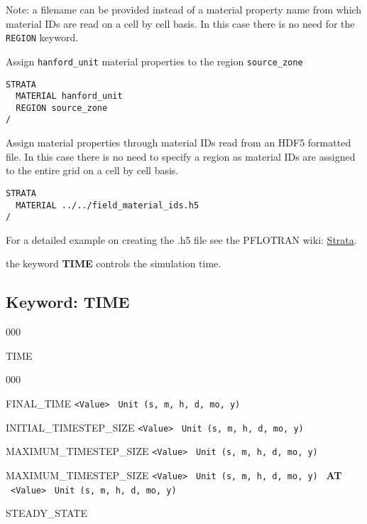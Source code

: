 \noindent
Note: a filename can be provided instead of a material property name from which material IDs are read on a cell by cell basis. In this case there is no need for the {\tt REGION} keyword.


\begin{mdframed}
\noindent
Assign {\tt hanford\_unit} material properties to the region {\tt source\_zone}

\begin{verbatim}
STRATA
  MATERIAL hanford_unit
  REGION source_zone
/
\end{verbatim}

\noindent
Assign material properties through material IDs read from an HDF5 formatted file. In this case there is no need to specify a region as material IDs are assigned to the entire grid on a cell by cell basis.

\begin{verbatim}
STRATA
  MATERIAL ../../field_material_ids.h5
/
\end{verbatim}

\noindent For a detailed example on creating the .h5 file see the PFLOTRAN wiki: \href{https://bitbucket.org/pflotran/pflotran-dev/wiki/Documentation/Strata}{Strata}.
\end{mdframed}

\hyperlink{target_key}{\return}


\newpage
\protect\hypertarget{target_time}{}

 the keyword {\bf TIME} controls the simulation time.

\subsection{Keyword: TIME}
\begin{deflist}{000}
\item[TIME] ~
\begin{deflist}{000}
\item[FINAL\_TIME] {\tt <Value>} \ {\tt Unit (s, m, h, d, mo, y)}
\item[INITIAL\_TIMESTEP\_SIZE] {\tt <Value>} \ {\tt Unit (s, m, h, d, mo, y)}
\item[MAXIMUM\_TIMESTEP\_SIZE] {\tt <Value>} \ {\tt Unit (s, m, h, d, mo, y)}
\item[MAXIMUM\_TIMESTEP\_SIZE] {\tt <Value>} \ {\tt Unit (s, m, h, d, mo, y)} \ {\bf AT} \ {\tt <Value>} \ {\tt Unit (s, m, h, d, mo, y)}
\item[STEADY\_STATE]
\end{deflist}
\item[\keyend]
\end{deflist}

